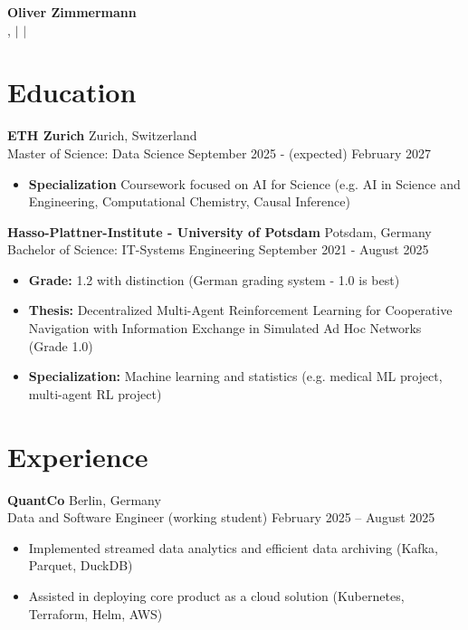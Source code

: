 \begin{center}
    {\LARGE \textbf{Oliver Zimmermann}} \\
    \vspace{2pt}
    \city, \country \(\mid\) \phone \(\mid\) \email \\
\end{center}

\section*{Education}

\textbf{ETH Zurich} \hfill Zurich, Switzerland \\
Master of Science: Data Science \hfill September 2025 - (expected) February 2027
\begin{itemize}[noitemsep, topsep=0pt]
    \item \textbf{Specialization} Coursework focused on AI for Science (e.g. AI in Science and Engineering, Computational Chemistry, Causal Inference)
\end{itemize}

\textbf{Hasso-Plattner-Institute - University of Potsdam} \hfill Potsdam, Germany \\
Bachelor of Science: IT-Systems Engineering \hfill September 2021 - August 2025
\begin{itemize}[noitemsep, topsep=0pt]
    \item \textbf{Grade:} 1.2 with distinction (German grading system - 1.0 is best)
    \item \textbf{Thesis:} Decentralized Multi-Agent Reinforcement Learning for Cooperative Navigation with
Information Exchange in Simulated Ad Hoc Networks (Grade 1.0)
    \item \textbf{Specialization:} Machine learning and statistics (e.g. medical ML project, multi-agent RL project)
\end{itemize}

\section*{Experience}

\textbf{QuantCo} \hfill Berlin, Germany \\
Data and Software Engineer (working student) \hfill February 2025 -- August 2025
\begin{itemize}[noitemsep, topsep=0pt]
    \item Implemented streamed data analytics and efficient data archiving (Kafka, Parquet, DuckDB)
    \item Assisted in deploying core product as a cloud solution (Kubernetes, Terraform, Helm, AWS)
\end{itemize}

